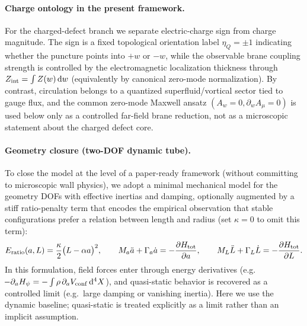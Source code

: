 \documentclass[11pt]{article}
\newcommand{\etaQ}{\eta_Q}
\newcommand{\Zint}{Z_{\rm int}}
\begin{document}
\paragraph{Charge ontology in the present framework.}
For the charged-defect branch we separate electric-charge sign from charge magnitude. The sign is a fixed topological orientation label $\etaQ=\pm1$ indicating whether the puncture points into $+w$ or $-w$, while the observable brane coupling strength is controlled by the electromagnetic localization thickness through $\Zint=\int Z(w)\,\dd w$ (equivalently by canonical zero-mode normalization). By contrast, circulation belongs to a quantized superfluid/vortical sector tied to gauge flux, and the common zero-mode Maxwell ansatz $(A_w=0,\partial_w A_\mu=0)$ is used below only as a controlled far-field brane reduction, not as a microscopic statement about the charged defect core.

\paragraph{Geometry closure (two-DOF dynamic tube).}
To close the model at the level of a paper-ready framework (without committing to microscopic wall physics), we adopt a minimal mechanical model for the geometry DOFs with effective inertias and damping, optionally augmented by a stiff ratio-penalty term that encodes the empirical observation that stable configurations prefer a relation between length and radius (set $\kappa=0$ to omit this term):
\begin{equation}
E_{\rm ratio}(a,L)=\frac{\kappa}{2}\big(L-\alpha a\big)^2,
\qquad
M_a\ddot a+\Gamma_a\dot a=-\frac{\partial H_{\rm tot}}{\partial a},
\qquad
M_L\ddot L+\Gamma_L\dot L=-\frac{\partial H_{\rm tot}}{\partial L}.
\end{equation}
In this formulation, field forces enter through energy derivatives (e.g.\ $\!-\partial_a H_\psi=-\int \rho\,\partial_a V_{\rm conf}\,\dd^4X$), and quasi-static behavior is recovered as a controlled limit (e.g.\ large damping or vanishing inertia). Here we use the dynamic baseline; quasi-static is treated explicitly as a limit rather than an implicit assumption.
\end{document}
